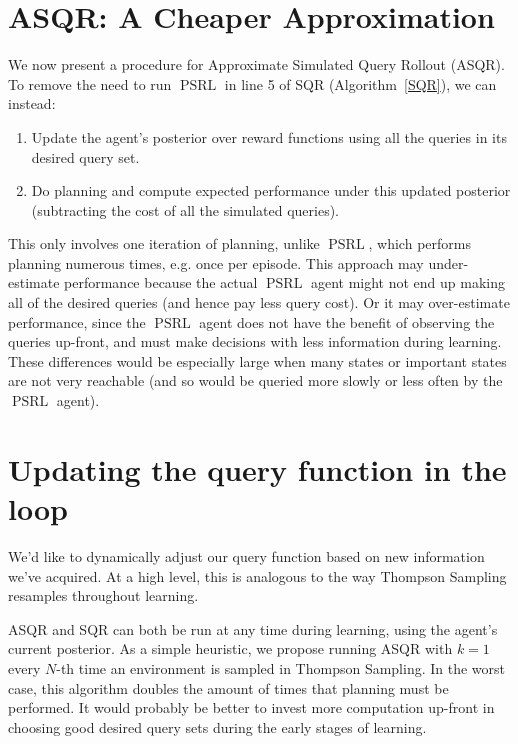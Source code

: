 \documentclass{article}
\begin{document}
\section{ASQR: A Cheaper Approximation}
We now present a procedure for Approximate Simulated Query Rollout (ASQR).
To remove the need to run $\mathop{PSRL}$ in line 5 of SQR (Algorithm~\ref{SQR}), we can instead:

\begin{enumerate}
\item Update the agent's posterior over reward functions using all the queries in its desired query set.%
\item Do planning and compute expected performance under this updated posterior (subtracting the cost of all the simulated queries).
\end{enumerate}

This only involves one iteration of planning, unlike $\mathop{PSRL}$, which performs planning numerous times, e.g. once per episode.
This approach may under-estimate performance because the actual $\mathop{PSRL}$ agent might not end up making all of the desired queries (and hence pay less query cost).
Or it may over-estimate performance, since the $\mathop{PSRL}$ agent does not have the benefit of observing the queries up-front, and must make decisions with less information during learning.
These differences would be especially large when many states or important states are not very reachable (and so would be queried more slowly or less often by the $\mathop{PSRL}$ agent).

\section{Updating the query function in the loop}
We'd like to dynamically adjust our query function based on new information we've acquired.
At a high level, this is analogous to the way Thompson Sampling resamples throughout learning.

ASQR and SQR can both be run at any time during learning, using the agent's current posterior.
As a simple heuristic, we propose running ASQR with $k=1$ every $N$-th time an environment is sampled in Thompson Sampling.
In the worst case, this algorithm doubles the amount of times that planning must be performed.
It would probably be better to invest more computation up-front in choosing good desired query sets during the early stages of learning.
\end{document}
